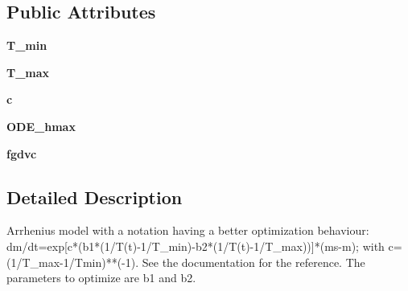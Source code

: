 \subsection*{\-Public \-Attributes}
\begin{DoxyCompactItemize}
\item 
\hypertarget{classFit__one__run_1_1ArrheniusModelAlternativeNotation2_a5c8d99a0bfb1d0b09ece9a03e0e7d614}{{\bfseries \-T\-\_\-min}}\label{classFit__one__run_1_1ArrheniusModelAlternativeNotation2_a5c8d99a0bfb1d0b09ece9a03e0e7d614}

\item 
\hypertarget{classFit__one__run_1_1ArrheniusModelAlternativeNotation2_ae15bee9047ddc788c76d5f3d37da05b7}{{\bfseries \-T\-\_\-max}}\label{classFit__one__run_1_1ArrheniusModelAlternativeNotation2_ae15bee9047ddc788c76d5f3d37da05b7}

\item 
\hypertarget{classFit__one__run_1_1ArrheniusModelAlternativeNotation2_a1112181ab62d1cb3520fe048bd242324}{{\bfseries c}}\label{classFit__one__run_1_1ArrheniusModelAlternativeNotation2_a1112181ab62d1cb3520fe048bd242324}

\item 
\hypertarget{classFit__one__run_1_1ArrheniusModelAlternativeNotation2_a1b0fc9003a29db87bd8de0e86223b4cb}{{\bfseries \-O\-D\-E\-\_\-hmax}}\label{classFit__one__run_1_1ArrheniusModelAlternativeNotation2_a1b0fc9003a29db87bd8de0e86223b4cb}

\item 
\hypertarget{classFit__one__run_1_1ArrheniusModelAlternativeNotation2_a82c2af40105ee8082c9ce161fa743f9e}{{\bfseries fgdvc}}\label{classFit__one__run_1_1ArrheniusModelAlternativeNotation2_a82c2af40105ee8082c9ce161fa743f9e}

\end{DoxyCompactItemize}


\subsection{\-Detailed \-Description}
\begin{DoxyVerb}Arrhenius model with a notation having a better optimization behaviour: dm/dt=exp[c*(b1*(1/T(t)-1/T_min)-b2*(1/T(t)-1/T_max))]*(ms-m); with c=(1/T_max-1/Tmin)**(-1). See the documentation for the reference. The parameters to optimize are b1 and b2.\end{DoxyVerb}
 

